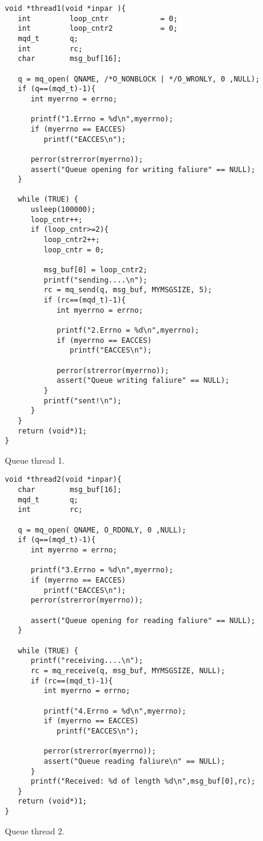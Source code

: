 \begin{table}[!hbp]
\begin{verbatim}
void *thread1(void *inpar ){ 
   int         loop_cntr            = 0; 
   int         loop_cntr2           = 0; 
   mqd_t       q; 
   int         rc; 
   char        msg_buf[16]; 

   q = mq_open( QNAME, /*O_NONBLOCK | */O_WRONLY, 0 ,NULL); 
   if (q==(mqd_t)-1){ 
      int myerrno = errno;

      printf("1.Errno = %d\n",myerrno);
      if (myerrno == EACCES)
         printf("EACCES\n");

      perror(strerror(myerrno)); 
      assert("Queue opening for writing faliure" == NULL);
   } 

   while (TRUE) {
      usleep(100000); 
      loop_cntr++; 
      if (loop_cntr>=2){ 
         loop_cntr2++; 
         loop_cntr = 0; 

         msg_buf[0] = loop_cntr2;
         printf("sending....\n"); 
         rc = mq_send(q, msg_buf, MYMSGSIZE, 5); 
         if (rc==(mqd_t)-1){
            int myerrno = errno;

            printf("2.Errno = %d\n",myerrno);
            if (myerrno == EACCES)
               printf("EACCES\n");

            perror(strerror(myerrno));
            assert("Queue writing faliure" == NULL); 
         } 
         printf("sent!\n"); 
      } 
   } 
   return (void*)1; 
} 
\end{verbatim}
\caption{Queue thread 1.\label{q_thread1}}
\end{table}

\begin{table}[!hbp]
\begin{verbatim}
void *thread2(void *inpar){ 
   char        msg_buf[16]; 
   mqd_t       q; 
   int         rc; 

   q = mq_open( QNAME, O_RDONLY, 0 ,NULL); 
   if (q==(mqd_t)-1){ 
      int myerrno = errno;

      printf("3.Errno = %d\n",myerrno);
      if (myerrno == EACCES)
         printf("EACCES\n");
      perror(strerror(myerrno)); 

      assert("Queue opening for reading faliure" == NULL); 
   } 

   while (TRUE) {
      printf("receiving....\n");
      rc = mq_receive(q, msg_buf, MYMSGSIZE, NULL);
      if (rc==(mqd_t)-1){
         int myerrno = errno;

         printf("4.Errno = %d\n",myerrno);
         if (myerrno == EACCES)
            printf("EACCES\n");

         perror(strerror(myerrno)); 
         assert("Queue reading faliure\n" == NULL); 
      } 
      printf("Received: %d of length %d\n",msg_buf[0],rc); 
   } 
   return (void*)1; 
}
\end{verbatim}
\caption{Queue thread 2.\label{q_thread2}}
\end{table}



